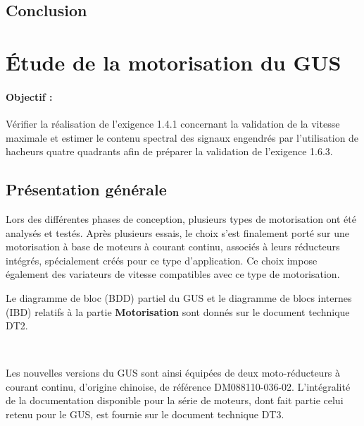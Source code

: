 
\subsection{Conclusion}


\section{Étude de la motorisation du GUS}

\paragraph{Objectif :} Vérifier la réalisation de l'exigence 1.4.1 concernant la validation de la vitesse maximale et estimer le contenu spectral des signaux engendrés par l'utilisation de hacheurs quatre quadrants afin de préparer la validation de l'exigence 1.6.3.

\subsection{Présentation générale}

Lors des différentes phases de conception, plusieurs types de motorisation ont été analysés et testés. Après plusieurs essais, le choix s'est finalement porté sur une motorisation à base de moteurs à courant continu, associés à leurs réducteurs intégrés, spécialement créés pour ce type d'application. Ce choix impose également des variateurs de vitesse compatibles avec ce type de motorisation.

Le diagramme de bloc (BDD) partiel du GUS et le diagramme de blocs internes (IBD) relatifs à la partie \textbf{Motorisation} sont donnés sur le document technique DT2.


~\

Les nouvelles versions du GUS sont ainsi équipées de deux moto-réducteurs à courant continu, d'origine chinoise, de référence DM088110-036-02. L'intégralité de la documentation disponible pour la série de moteurs, dont fait partie celui retenu pour le GUS, est fournie sur le document
technique DT3.


